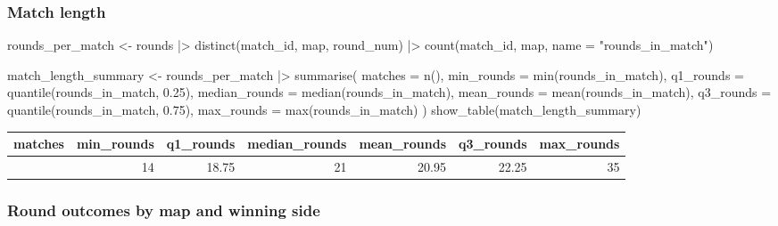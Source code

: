 \documentclass[
  letterpaper,
  DIV=11,
  numbers=noendperiod]{scrartcl}
\newenvironment{Shaded}{\begin{snugshade}}{\end{snugshade}}
\newcommand{\AttributeTok}[1]{\textcolor[rgb]{0.40,0.45,0.13}{#1}}
\newcommand{\FloatTok}[1]{\textcolor[rgb]{0.68,0.00,0.00}{#1}}
\newcommand{\FunctionTok}[1]{\textcolor[rgb]{0.28,0.35,0.67}{#1}}
\newcommand{\NormalTok}[1]{\textcolor[rgb]{0.00,0.23,0.31}{#1}}
\newcommand{\OtherTok}[1]{\textcolor[rgb]{0.00,0.23,0.31}{#1}}
\newcommand{\SpecialCharTok}[1]{\textcolor[rgb]{0.37,0.37,0.37}{#1}}
\newcommand{\StringTok}[1]{\textcolor[rgb]{0.13,0.47,0.30}{#1}}
\newcounter{none} %
\begin{document}
\subsubsection{Match length}\label{match-length}

\begin{Shaded}
\begin{Highlighting}[]
\NormalTok{rounds\_per\_match }\OtherTok{\textless{}{-}}\NormalTok{ rounds }\SpecialCharTok{|\textgreater{}}
  \FunctionTok{distinct}\NormalTok{(match\_id, map, round\_num) }\SpecialCharTok{|\textgreater{}}
  \FunctionTok{count}\NormalTok{(match\_id, map, }\AttributeTok{name =} \StringTok{"rounds\_in\_match"}\NormalTok{)}

\NormalTok{match\_length\_summary }\OtherTok{\textless{}{-}}\NormalTok{ rounds\_per\_match }\SpecialCharTok{|\textgreater{}}
  \FunctionTok{summarise}\NormalTok{(}
    \AttributeTok{matches =} \FunctionTok{n}\NormalTok{(),}
    \AttributeTok{min\_rounds =} \FunctionTok{min}\NormalTok{(rounds\_in\_match),}
    \AttributeTok{q1\_rounds =} \FunctionTok{quantile}\NormalTok{(rounds\_in\_match, }\FloatTok{0.25}\NormalTok{),}
    \AttributeTok{median\_rounds =} \FunctionTok{median}\NormalTok{(rounds\_in\_match),}
    \AttributeTok{mean\_rounds =} \FunctionTok{mean}\NormalTok{(rounds\_in\_match),}
    \AttributeTok{q3\_rounds =} \FunctionTok{quantile}\NormalTok{(rounds\_in\_match, }\FloatTok{0.75}\NormalTok{),}
    \AttributeTok{max\_rounds =} \FunctionTok{max}\NormalTok{(rounds\_in\_match)}
\NormalTok{  )}
\FunctionTok{show\_table}\NormalTok{(match\_length\_summary)}
\end{Highlighting}
\end{Shaded}

{\def\LTcaptype{none} %
\begin{longtable}[]{@{}rrrrrrr@{}}
\toprule\noalign{}
matches & min\_rounds & q1\_rounds & median\_rounds & mean\_rounds &
q3\_rounds & max\_rounds \\
\midrule\noalign{}
\endhead
\bottomrule\noalign{}
\endlastfoot
60 & 14 & 18.75 & 21 & 20.95 & 22.25 & 35 \\
\end{longtable}
}

\subsubsection{Round outcomes by map and winning
side}\label{round-outcomes-by-map-and-winning-side}
\end{document}
